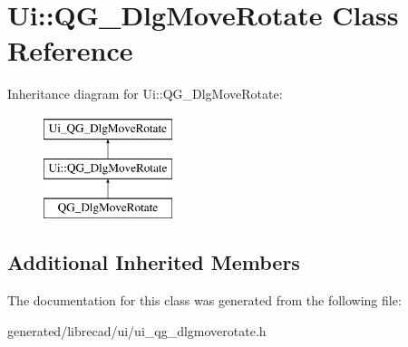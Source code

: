 \hypertarget{classUi_1_1QG__DlgMoveRotate}{\section{Ui\-:\-:Q\-G\-\_\-\-Dlg\-Move\-Rotate Class Reference}
\label{classUi_1_1QG__DlgMoveRotate}
}
Inheritance diagram for Ui\-:\-:Q\-G\-\_\-\-Dlg\-Move\-Rotate\-:\begin{figure}[H]
\begin{center}
\leavevmode
\includegraphics[height=3.000000cm]{classUi_1_1QG__DlgMoveRotate}
\end{center}
\end{figure}
\subsection*{Additional Inherited Members}


The documentation for this class was generated from the following file\-:\begin{DoxyCompactItemize}
\item 
generated/librecad/ui/ui\-\_\-qg\-\_\-dlgmoverotate.\-h\end{DoxyCompactItemize}
